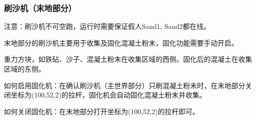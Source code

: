 \documentclass[UTF8,a4paper]{article}
\begin{document}
			\subsubsection{刷沙机（末地部分）}
				\par 注意：刷沙机不可空跑，运行时需要保证假人Sand1, Sand2都在线。
				\par 末地部分的刷沙机主要用于收集及固化混凝土粉末，固化功能需要手动开启。
				\par 重力方块，如铁砧、沙子、混凝土粉末在收集区域的西侧。固化后的混凝土在收集区域的东侧。
				\par 如何启用固化机：在确认刷沙机（主世界部分）只刷混凝土粉末时，在末地部分关闭坐标为(100,52,2)的拉杆，固化机会自动固化混凝土粉末并收集。
				\par 如何关闭固化机：在末地部分打开坐标为(100,52,2)的拉杆即可。
			\subsubsection{}
\end{document}
